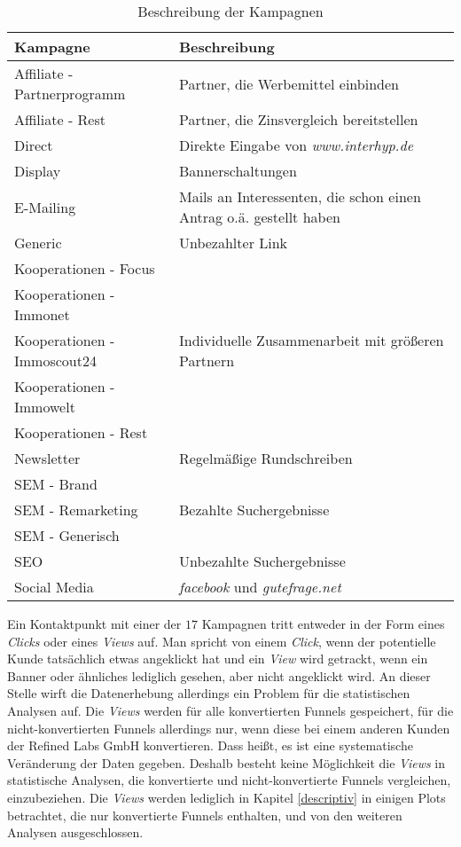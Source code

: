 \begin{table}[H]
	\begin{center}
		\begin{tabular}{|l|p{9cm}|}
			\hline \textbf{Kampagne} & \textbf{Beschreibung}\\ \hline
			\hline Affiliate - Partnerprogramm & Partner, die Werbemittel einbinden\\
			\hline Affiliate - Rest & Partner, die Zinsvergleich bereitstellen\\ 
			\hline Direct & Direkte Eingabe von \textit{www.interhyp.de}\\ 
			\hline Display & Bannerschaltungen\\
			\hline E-Mailing & Mails an Interessenten, die schon einen Antrag o.ä. gestellt haben\\
			\hline Generic & Unbezahlter Link\\
			\hline Kooperationen - Focus & \multirow{5}{6cm}{Individuelle Zusammenarbeit mit größeren Partnern}\\
			Kooperationen - Immonet & \\
			Kooperationen - Immoscout24 & \\
			Kooperationen - Immowelt & \\
			Kooperationen - Rest & \\
			\hline Newsletter & Regelmäßige Rundschreiben\\
			\hline SEM - Brand & \multirow{3}{6cm}{Bezahlte Suchergebnisse}\\
			SEM - Remarketing & \\
			SEM - Generisch & \\
			\hline SEO & Unbezahlte Suchergebnisse\\
			\hline Social Media & \textit{facebook} und \textit{gutefrage.net}\\
			\hline
		\end{tabular} 
	\end{center}
	\caption{Beschreibung der Kampagnen}\label{beschreibungCampaign}
\end{table}
Ein Kontaktpunkt mit einer der $17$ Kampagnen tritt entweder in der Form eines \textit{Clicks} oder eines \textit{Views} auf. Man spricht von einem \textit{Click}, wenn der potentielle Kunde tatsächlich etwas angeklickt hat und ein \textit{View} wird getrackt, wenn ein Banner oder ähnliches lediglich gesehen, aber nicht angeklickt wird. An dieser Stelle wirft die Datenerhebung allerdings ein Problem für die statistischen Analysen auf. Die \textit{Views} werden für alle konvertierten Funnels gespeichert, für die nicht-konvertierten Funnels allerdings nur, wenn diese bei einem anderen Kunden der Refined Labs GmbH konvertieren. Dass heißt, es ist eine systematische Veränderung der Daten gegeben. Deshalb besteht keine Möglichkeit die \textit{Views} in statistische Analysen, die konvertierte und nicht-konvertierte Funnels vergleichen, einzubeziehen. Die \textit{Views} werden lediglich in Kapitel \ref{descriptiv} in einigen Plots betrachtet, die nur konvertierte Funnels enthalten, und von den weiteren Analysen ausgeschlossen.\\
